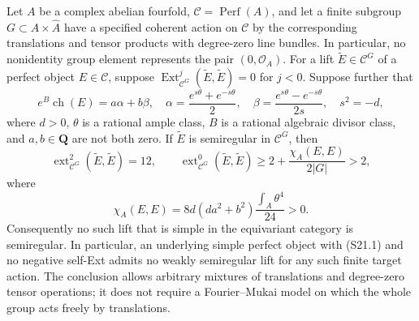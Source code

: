\begin{proposition}
\label{prop:semireg-all-finite-target-actions}
Let $A$ be a complex abelian fourfold, $\mathcal C=
\operatorname{Perf}(A)$, and let a finite subgroup
$G\subset A\times\widehat A$ have a specified coherent action
on $\mathcal C$ by the corresponding translations and
tensor products with degree-zero line bundles. In particular,
no nonidentity group element represents the pair $(0,\mathcal O_A)$.
For a lift $\widetilde E\in\mathcal C^G$ of a perfect object
$E\in\mathcal C$, suppose
$\operatorname{Ext}^{j}_{\mathcal C^G}(\widetilde E,
\widetilde E)=0$ for $j<0$. Suppose further that
\[
 e^B\operatorname{ch}(E)=a\alpha+b\beta,
 \quad
 \alpha=\frac{e^{s\theta}+e^{-s\theta}}2,
 \quad
 \beta=\frac{e^{s\theta}-e^{-s\theta}}{2s},
 \quad s^2=-d,
 \tag{S21.1}
\]
where $d>0$, $\theta$ is a rational ample class,
$B$ is a rational algebraic divisor class, and
$a,b\in\mathbf Q$ are not both zero.
If $\widetilde E$ is semiregular in $\mathcal C^G$, then
\[
 \operatorname{ext}^2_{\mathcal C^G}(\widetilde E,
              \widetilde E)=12,
 \qquad
 \operatorname{ext}^0_{\mathcal C^G}(\widetilde E,
              \widetilde E)
 \ge 2+\frac{\chi_A(E,E)}{2|G|}>2,
 \tag{S21.2}
\]
where
\[
 \chi_A(E,E)=8d(da^2+b^2)\frac{\int_A\theta^4}{24}>0.
 \tag{S21.3}
\]
Consequently no such lift that is simple in the equivariant
category is semiregular. In particular, an underlying simple
perfect object with (S21.1) and no negative self-Ext admits no
weakly semiregular lift for any such finite target action.
The conclusion allows arbitrary mixtures of translations
and degree-zero tensor operations; it does not require a
Fourier--Mukai model on which the whole group acts freely
by translations.
\end{proposition}

